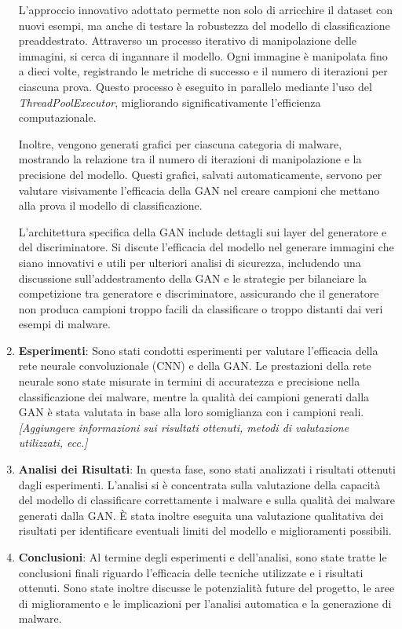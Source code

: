 \begin{enumerate}
    L'approccio innovativo adottato permette non solo di arricchire il dataset con nuovi esempi, ma anche di testare la robustezza del modello di classificazione preaddestrato. Attraverso un processo iterativo di manipolazione delle immagini, si cerca di ingannare il modello. Ogni immagine è manipolata fino a dieci volte, registrando le metriche di successo e il numero di iterazioni per ciascuna prova. Questo processo è eseguito in parallelo mediante l'uso del \textit{ThreadPoolExecutor}, migliorando significativamente l'efficienza computazionale.

    Inoltre, vengono generati grafici per ciascuna categoria di malware, mostrando la relazione tra il numero di iterazioni di manipolazione e la precisione del modello. Questi grafici, salvati automaticamente, servono per valutare visivamente l'efficacia della GAN nel creare campioni che mettano alla prova il modello di classificazione.

    L'architettura specifica della GAN include dettagli sui layer del generatore e del discriminatore. Si discute l'efficacia del modello nel generare immagini che siano innovativi e utili per ulteriori analisi di sicurezza, includendo una discussione sull'addestramento della GAN e le strategie per bilanciare la competizione tra generatore e discriminatore, assicurando che il generatore non produca campioni troppo facili da classificare o troppo distanti dai veri esempi di malware.

    \item \textbf{Esperimenti}: Sono stati condotti esperimenti per valutare l'efficacia della rete neurale convoluzionale (CNN) e della GAN. Le prestazioni della rete neurale sono state misurate in termini di accuratezza e precisione nella classificazione dei malware, mentre la qualità dei campioni generati dalla GAN è stata valutata in base alla loro somiglianza con i campioni reali. \textit{[Aggiungere informazioni sui risultati ottenuti, metodi di valutazione utilizzati, ecc.]}
    
    \item \textbf{Analisi dei Risultati}: In questa fase, sono stati analizzati i risultati ottenuti dagli esperimenti. L'analisi si è concentrata sulla valutazione della capacità del modello di classificare correttamente i malware e sulla qualità dei malware generati dalla GAN. È stata inoltre eseguita una valutazione qualitativa dei risultati per identificare eventuali limiti del modello e miglioramenti possibili.
    
    \item \textbf{Conclusioni}: Al termine degli esperimenti e dell'analisi, sono state tratte le conclusioni finali riguardo l'efficacia delle tecniche utilizzate e i risultati ottenuti. Sono state inoltre discusse le potenzialità future del progetto, le aree di miglioramento e le implicazioni per l'analisi automatica e la generazione di malware.
\end{enumerate}


